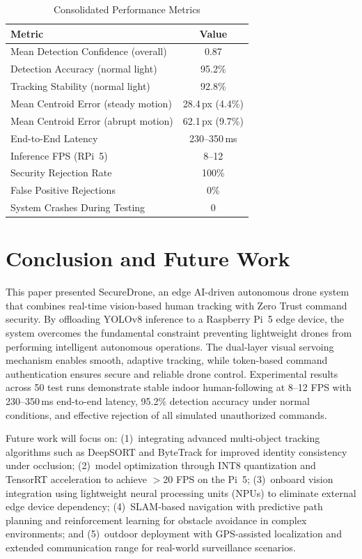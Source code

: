 \documentclass[conference]{IEEEtran}
\begin{document}
\begin{table}[!t]
\centering
\caption{Consolidated Performance Metrics}
\label{tab:summary}
\begin{tabular}{lc}
\toprule
\textbf{Metric} & \textbf{Value} \\
\midrule
Mean Detection Confidence (overall)     & 0.87 \\
Detection Accuracy (normal light)       & 95.2\% \\
Tracking Stability (normal light)       & 92.8\% \\
Mean Centroid Error (steady motion)     & 28.4\,px (4.4\%) \\
Mean Centroid Error (abrupt motion)     & 62.1\,px (9.7\%) \\
End-to-End Latency                       & 230--350\,ms \\
Inference FPS (RPi~5)                    & 8--12 \\
Security Rejection Rate                  & 100\% \\
False Positive Rejections                & 0\% \\
System Crashes During Testing            & 0 \\
\bottomrule
\end{tabular}
\end{table}

\section{Conclusion and Future Work}
\label{sec:conclusion}

This paper presented SecureDrone, an edge AI-driven autonomous drone system that combines real-time vision-based human tracking with Zero Trust command security. By offloading YOLOv8 inference to a Raspberry Pi~5 edge device, the system overcomes the fundamental constraint preventing lightweight drones from performing intelligent autonomous operations. The dual-layer visual servoing mechanism enables smooth, adaptive tracking, while token-based command authentication ensures secure and reliable drone control. Experimental results across 50 test runs demonstrate stable indoor human-following at 8--12 FPS with 230--350\,ms end-to-end latency, 95.2\% detection accuracy under normal conditions, and effective rejection of all simulated unauthorized commands.

Future work will focus on: (1)~integrating advanced multi-object tracking algorithms such as DeepSORT and ByteTrack for improved identity consistency under occlusion; (2)~model optimization through INT8 quantization and TensorRT acceleration to achieve $>$20 FPS on the Pi~5; (3)~onboard vision integration using lightweight neural processing units (NPUs) to eliminate external edge device dependency; (4)~SLAM-based navigation with predictive path planning and reinforcement learning for obstacle avoidance in complex environments; and (5)~outdoor deployment with GPS-assisted localization and extended communication range for real-world surveillance scenarios.
\end{document}
